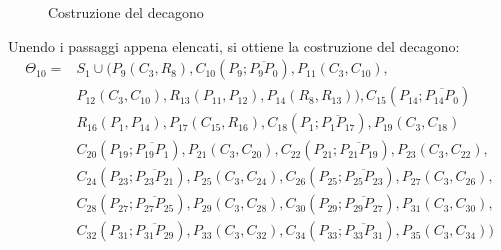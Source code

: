 \begin{figure}[!h]
\begin{center}
\caption{Costruzione del decagono}
\end{center}
\end{figure}

Unendo i passaggi appena elencati, si ottiene la costruzione del decagono:
\begin{align*}
\Theta_{10} =  & S_{1} \cup (P_{9}(C_{3}, R_{8}),  C_{10}(P_{9};\overline{P_{9} P_{0}}), P_{11}(C_{3}, C_{10}), \\
&P_{12}(C_{3}, C_{10}), R_{13}(P_{11}, P_{12}), P_{14}(R_{8}, R_{13})), C_{15}(P_{14};\overline{P_{14} P_{0}}) \\
& R_{16}(P_{1}, P_{14}), P_{17}(C_{15}, R_{16}), C_{18}(P_{1};\overline{P_{1} P_{17}}), P_{19}(C_{3},C_{18}) \\
&C_{20}(P_{19};\overline{P_{19} P_{1}}), P_{21}(C_{3}, C_{20}), C_{22}(P_{21};\overline{P_{21} P_{19}}), P_{23}(C_{3}, C_{22}), \\
&C_{24}(P_{23};\overline{P_{23} P_{21}}), P_{25}(C_{3}, C_{24}), C_{26}(P_{25};\overline{P_{25} P_{23}}), P_{27}(C_{3}, C_{26}), \\
&C_{28}(P_{27};\overline{P_{27} P_{25}}), P_{29}(C_{3}, C_{28}), C_{30}(P_{29};\overline{P_{29} P_{27}}), P_{31}(C_{3}, C_{30}), \\
&C_{32}(P_{31};\overline{P_{31} P_{29}}), P_{33}(C_{3}, C_{32}), C_{34}(P_{33};\overline{P_{33} P_{31}}), P_{35}(C_{3}, C_{34}))
\end{align*}

